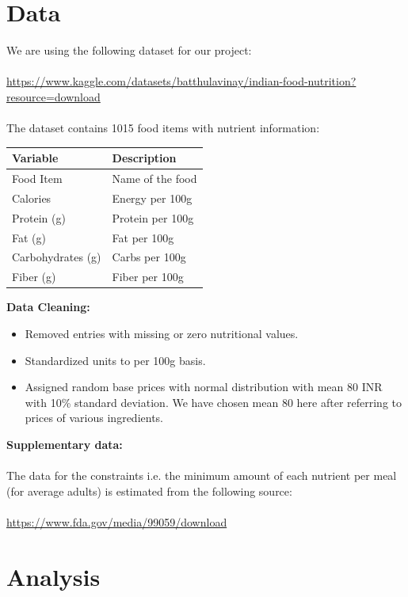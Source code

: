 \documentclass{article}
\begin{document}
\section*{Data}
We are using the following dataset for our project:\\
\\
\href{https://www.kaggle.com/datasets/batthulavinay/indian-food-nutrition?resource=download}{https://www.kaggle.com/datasets/batthulavinay/indian-food-nutrition?resource=download}\\
\\
The dataset contains 1015 food items with nutrient information:
\begin{center}
\begin{tabular}{ll}
\toprule
\textbf{Variable} & \textbf{Description} \\
\midrule
Food Item & Name of the food \\
Calories & Energy per 100g \\
Protein (g) & Protein per 100g \\
Fat (g) & Fat per 100g \\
Carbohydrates (g) & Carbs per 100g \\
Fiber (g) & Fiber per 100g \\
\bottomrule
\end{tabular}
\end{center}

\textbf{Data Cleaning:}
\begin{itemize}
    \item Removed entries with missing or zero nutritional values.
    \item Standardized units to per 100g basis.
    \item Assigned random base prices with normal distribution with mean 80 INR with 10\% standard deviation. We have chosen mean 80 here after referring to prices of various ingredients.
\end{itemize}
\textbf{Supplementary data:}
\\
\\
The data for the constraints i.e. the minimum amount of each nutrient per meal (for average adults) is estimated from the following source:
\\
\\
\href{https://www.fda.gov/media/99059/download}{https://www.fda.gov/media/99059/download}

\section*{Analysis}
\end{document}
